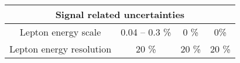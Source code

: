 \begin{table}[!htb]
\begin{center}
\begin{tabular}{|c|c|c|c|}
			\hline %
			\hline %
			\multicolumn{4}{|c|}{Signal related uncertainties} \\
			\hline %
			Lepton energy scale & 0.04 -- 0.3 \% & 0 \% & 0\% \\ 
			Lepton energy resolution & 20 \% & 20 \%  & 20 \% \\ 
			\hline %
			\hline %
		\end{tabular}
		\normalsize
	\end{center}
\end{table}




